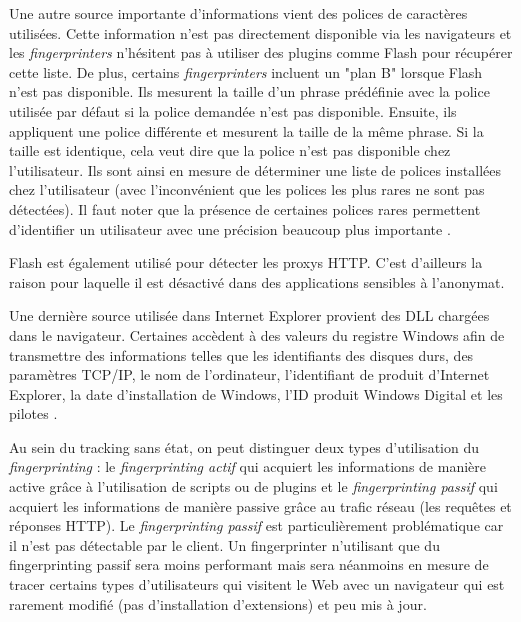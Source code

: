 Une autre source importante d'informations vient des polices de caractères utilisées. Cette information n'est pas directement disponible via les navigateurs et les \textit{fingerprinters} n'hésitent pas à utiliser des plugins comme Flash pour récupérer cette liste. De plus, certains \textit{fingerprinters} incluent un "plan B" lorsque Flash n'est pas disponible. Ils mesurent la taille d'un phrase prédéfinie avec la police utilisée par défaut si la police demandée n'est pas disponible. Ensuite, ils appliquent une police différente et mesurent la taille de la même phrase. Si la taille est identique, cela veut dire que la police n'est pas disponible chez l'utilisateur. Ils sont ainsi en mesure de déterminer une liste de polices installées chez l'utilisateur (avec l'inconvénient que les polices les plus rares ne sont pas détectées). Il faut noter que la présence de certaines polices rares permettent d'identifier un utilisateur avec une précision beaucoup plus importante \cite{Boda:2011:UTW:2341491.2341497}.

Flash est également utilisé pour détecter les proxys HTTP. C'est d'ailleurs la raison pour laquelle il est désactivé dans des applications sensibles à l'anonymat.

Une dernière source utilisée dans Internet Explorer provient des DLL chargées dans le navigateur. Certaines accèdent à des valeurs du registre Windows afin de transmettre des informations telles que les identifiants des disques durs, des paramètres TCP/IP, le nom de l'ordinateur, l'identifiant de produit d'Internet Explorer, la date d'installation de Windows, l'ID produit Windows Digital et les pilotes \cite{Nikiforakis:2013:CME:2497621.2498133}.

Au sein du tracking sans état, on peut distinguer deux types d'utilisation du \textit{fingerprinting} : le \textit{fingerprinting actif} qui acquiert les informations de manière active grâce à l'utilisation de scripts ou de plugins et le \textit{fingerprinting passif} qui acquiert les informations de manière passive grâce au trafic réseau (les requêtes et réponses HTTP).
Le \textit{fingerprinting passif} est particulièrement problématique car il n'est pas détectable par le client. Un fingerprinter n'utilisant que du fingerprinting passif sera moins performant mais sera néanmoins en mesure de tracer certains types d'utilisateurs qui visitent le Web avec un navigateur qui est rarement modifié (pas d'installation d'extensions) et peu mis à jour.
\newline

